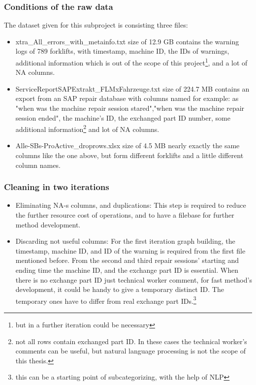 		\subsubsection{Conditions of the raw data}
		The dataset given for this subproject is consisting three files:
		\begin{itemize}
			\item{xtra\_All\_errors\_with\_metainfo.txt} size of 12.9 GB contains the warning logs of 789 forklifts, with timestamp, machine ID, the IDs of warnings, additional information which is out of the scope of this project\footnote{but in a further iteration could be necessary}, and a lot of NA columns.
			\item{ServiceReportSAPExtrakt\_FLMxFahrzeuge.txt} size of 224.7 MB contains an export from an SAP repair database with columns named for example: as "when was the machine repair session stared","when was the machine repair session ended", the machine's ID, the exchanged part ID number, some additional information\footnote{not all rows contain exchanged part ID. In these cases the technical worker's comments can be useful, but natural language processing is not the scope of this thesis.} and lot of NA columns.
			\item{Alle-SBs-ProActive\_droprows.xlsx} size of 4.5 MB nearly exactly the same columns like the one above, but form different forklifts and a little different column names.
		\end{itemize}
		\subsubsection{Cleaning in two iterations}
		\begin{itemize}
			\item{Eliminating NA-s columns, and duplications:} This step is required to reduce the further resource cost of operations, and to have a filebase for further method development.
			\item{Discarding not useful columns:} For the first iteration graph building, the timestamp, machine ID, and ID of the warning is required from the first file mentioned before. From the second and third repair sessions' starting and ending time the machine ID, and the exchange part ID is essential. When there is no exchange part ID just technical worker comment, for fast method's development, it could be handy to give a temporary distinct ID. The temporary ones have to differ from real exchange part IDs.\footnote{this can be a starting point of subcategorizing, with the help of NLP} 
		\end{itemize}
